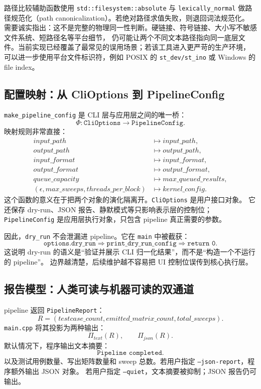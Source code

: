 路径比较辅助函数使用 \texttt{std::filesystem::absolute} 与 \texttt{lexically\_normal}
做路径规范化（path canonicalization）。若绝对路径求值失败，则退回词法规范化。
需要诚实指出：这不是完整的物理同一性判断。硬链接、符号链接、大小写不敏感文件系统、短路径名等平台细节，
仍可能让两个不同文本路径指向同一底层文件。当前实现已经覆盖了最常见的误用场景；若该工具进入更严苛的生产环境，
可以进一步使用平台文件标识符，例如 POSIX 的 \texttt{st\_dev/st\_ino} 或 Windows 的 file index。

\subsection{配置映射：从 CliOptions 到 PipelineConfig}

\texttt{make\_pipeline\_config} 是 CLI 层与应用层之间的唯一桥：
\[
    \Phi:\texttt{CliOptions}\rightarrow\texttt{PipelineConfig}.
\]
映射规则非常直接：
\[
\begin{aligned}
    input\_path          &\mapsto input\_path,\\
    output\_path         &\mapsto output\_path,\\
    input\_format        &\mapsto input\_format,\\
    output\_format       &\mapsto output\_format,\\
    queue\_capacity      &\mapsto max\_queued\_results,\\
    (\epsilon,max\_sweeps,threads\_per\_block)
        &\mapsto kernel\_config.
\end{aligned}
\]
这个函数的意义在于把两个对象的演化隔离开。\texttt{CliOptions} 是用户接口对象。
它还保存 dry-run、JSON 报告、静默模式等只影响表示层的控制位；\texttt{PipelineConfig}
是应用层执行对象，只包含 pipeline 真正需要的参数。

因此，\texttt{dry\_run} 不会泄漏进 pipeline。它在 \texttt{main} 中被截获：
\[
    \texttt{options.dry\_run}
    \Rightarrow
    \texttt{print\_dry\_run\_config}
    \Rightarrow
    \texttt{return 0}.
\]
这说明 dry-run 的语义是“验证并展示 CLI 归一化结果”，而不是“构造一个不运行的 pipeline”。
边界越清楚，后续维护越不容易把 UI 控制位误传到核心执行层。

\subsection{报告模型：人类可读与机器可读的双通道}

pipeline 返回 \texttt{PipelineReport}：
\[
    R=(testcase\_count,emitted\_matrix\_count,total\_sweeps).
\]
\texttt{main.cpp} 将其投影为两种输出：
\[
    \Pi_{text}(R),\qquad \Pi_{json}(R).
\]
默认情况下，程序输出文本摘要：
\[
    \texttt{Pipeline completed.}
\]
以及测试用例数量、写出矩阵数量和 sweep 总数。若用户指定 \texttt{--json-report}，程序额外输出 JSON 对象。
若用户指定 \texttt{--quiet}，文本摘要被抑制；JSON 报告仍可输出。

